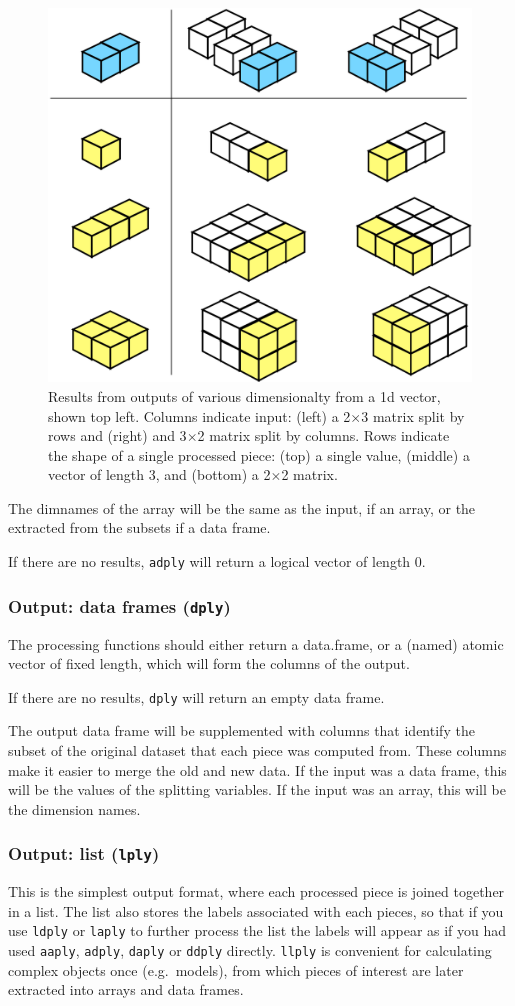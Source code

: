 \documentclass[letterpaper,oneside]{scrartcl}
\begin{document}
\begin{figure}[htbp]
  \centering
  \includegraphics[width= 0.45 \textwidth]{function-2d}
  \caption{Results from outputs of various dimensionalty from a 1d vector, shown top left.  Columns indicate input: (left) a 2$\times$3 matrix split by rows and (right) and 3$\times$2 matrix split by columns.  Rows indicate the shape of a single processed piece: (top) a single value, (middle) a vector of length 3, and (bottom) a 2$\times$2 matrix.}
  \label{fig:function-2d}
\end{figure}


The dimnames of the array will be the same as the input, if an array, or the extracted from the subsets if a data frame.

If there are no results, {\tt adply} will return a logical vector of length 0.

\subsubsection{Output: data frames ({\tt *dply})}

The processing functions should either return a data.frame, or a (named) atomic vector of fixed length, which will form the columns of the output.

If there are no results, {\tt *dply} will return an empty data frame.

The output data frame will be supplemented with columns that identify the subset of the original dataset that each piece was computed from.  These columns make it easier to merge the old and new data.  If the input was a data frame, this will be the values of the splitting variables.  If the input was an array, this will be the dimension names.

\subsubsection{Output: list ({\tt *lply})}

This is the simplest output format, where each processed piece is joined together in a list.  The list also stores the labels associated with each pieces, so that if you use {\tt ldply} or {\tt laply} to further process the list the labels will appear as if you had used {\tt aaply}, {\tt adply}, {\tt daply} or {\tt ddply} directly.  {\tt llply} is convenient for calculating complex objects once (e.g.\ models), from which pieces of interest are later extracted into arrays and data frames.
\end{document}
